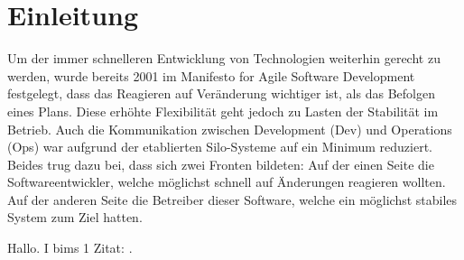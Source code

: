 \chapter{Einleitung}

Um der immer schnelleren Entwicklung von Technologien weiterhin gerecht zu werden, wurde bereits 2001 im Manifesto for Agile Software Development festgelegt, dass das Reagieren auf Veränderung wichtiger ist, als das Befolgen eines Plans. Diese erhöhte Flexibilität geht jedoch zu Lasten der Stabilität im Betrieb. Auch die Kommunikation zwischen Development (Dev) und Operations (Ops) war aufgrund der etablierten Silo-Systeme auf ein Minimum reduziert. Beides trug dazu bei, dass sich zwei Fronten bildeten: Auf der einen Seite die Softwareentwickler, welche möglichst schnell auf Änderungen reagieren wollten. Auf der anderen Seite die Betreiber dieser Software, welche ein möglichst stabiles System zum Ziel hatten.

Hallo. I bims 1 Zitat: \cite{yamlwebsite}.
